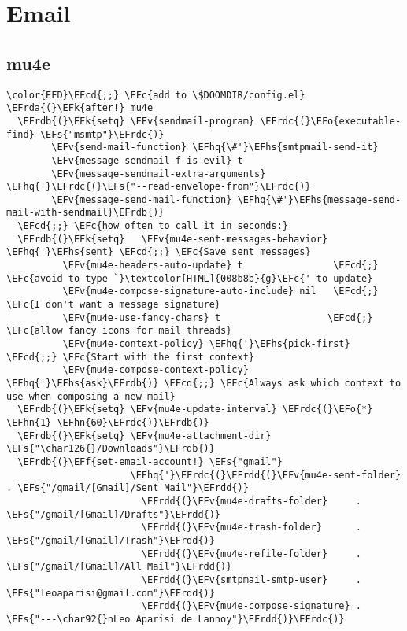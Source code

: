 \documentclass[c]{article}
\theoremstyle{plain}%
\theoremstyle{definition}
\theoremstyle{remark}
\newcommand{\EFc}[1]{\textcolor{EFc}{#1}} %
\newcommand{\EFcd}[1]{\textcolor{EFcd}{#1}} %
\newcommand{\EFs}[1]{\textcolor{EFs}{#1}} %
\newcommand{\EFk}[1]{\textcolor{EFk}{#1}} %
\newcommand{\EFf}[1]{\textcolor{EFf}{#1}} %
\newcommand{\EFv}[1]{\textcolor{EFv}{#1}} %
\newcommand{\EFo}[1]{\textcolor{EFo}{#1}} %
\newcommand{\EFhn}[1]{\textcolor{EFhn}{\textbf{#1}}} %
\newcommand{\EFhq}[1]{\textcolor{EFhq}{#1}} %
\newcommand{\EFhs}[1]{\textcolor{EFhs}{#1}} %
\newcommand{\EFrda}[1]{\textcolor{EFrda}{#1}} %
\newcommand{\EFrdb}[1]{\textcolor{EFrdb}{#1}} %
\newcommand{\EFrdc}[1]{\textcolor{EFrdc}{#1}} %
\newcommand{\EFrdd}[1]{\textcolor{EFrdd}{#1}} %
\begin{document}
\section{Email}
\label{sec:org50947d9}
\subsection{mu4e}
\label{sec:org470a5e9}
\begin{Code}
\begin{Verbatim}
\color{EFD}\EFcd{;;} \EFc{add to \$DOOMDIR/config.el}
\EFrda{(}\EFk{after!} mu4e
  \EFrdb{(}\EFk{setq} \EFv{sendmail-program} \EFrdc{(}\EFo{executable-find} \EFs{"msmtp"}\EFrdc{)}
        \EFv{send-mail-function} \EFhq{\#'}\EFhs{smtpmail-send-it}
        \EFv{message-sendmail-f-is-evil} t
        \EFv{message-sendmail-extra-arguments} \EFhq{'}\EFrdc{(}\EFs{"--read-envelope-from"}\EFrdc{)}
        \EFv{message-send-mail-function} \EFhq{\#'}\EFhs{message-send-mail-with-sendmail}\EFrdb{)}
  \EFcd{;;} \EFc{how often to call it in seconds:}
  \EFrdb{(}\EFk{setq}   \EFv{mu4e-sent-messages-behavior} \EFhq{'}\EFhs{sent} \EFcd{;;} \EFc{Save sent messages}
          \EFv{mu4e-headers-auto-update} t                \EFcd{;} \EFc{avoid to type `}\textcolor[HTML]{008b8b}{g}\EFc{' to update}
          \EFv{mu4e-compose-signature-auto-include} nil   \EFcd{;} \EFc{I don't want a message signature}
          \EFv{mu4e-use-fancy-chars} t                   \EFcd{;} \EFc{allow fancy icons for mail threads}
          \EFv{mu4e-context-policy} \EFhq{'}\EFhs{pick-first}   \EFcd{;;} \EFc{Start with the first context}
          \EFv{mu4e-compose-context-policy} \EFhq{'}\EFhs{ask}\EFrdb{)} \EFcd{;;} \EFc{Always ask which context to use when composing a new mail}
  \EFrdb{(}\EFk{setq} \EFv{mu4e-update-interval} \EFrdc{(}\EFo{*} \EFhn{1} \EFhn{60}\EFrdc{)}\EFrdb{)}
  \EFrdb{(}\EFk{setq} \EFv{mu4e-attachment-dir} \EFs{"\char126{}/Downloads"}\EFrdb{)}
  \EFrdb{(}\EFf{set-email-account!} \EFs{"gmail"}
                      \EFhq{'}\EFrdc{(}\EFrdd{(}\EFv{mu4e-sent-folder}       . \EFs{"/gmail/[Gmail]/Sent Mail"}\EFrdd{)}
                        \EFrdd{(}\EFv{mu4e-drafts-folder}     . \EFs{"/gmail/[Gmail]/Drafts"}\EFrdd{)}
                        \EFrdd{(}\EFv{mu4e-trash-folder}      . \EFs{"/gmail/[Gmail]/Trash"}\EFrdd{)}
                        \EFrdd{(}\EFv{mu4e-refile-folder}     . \EFs{"/gmail/[Gmail]/All Mail"}\EFrdd{)}
                        \EFrdd{(}\EFv{smtpmail-smtp-user}     . \EFs{"leoaparisi@gmail.com"}\EFrdd{)}
                        \EFrdd{(}\EFv{mu4e-compose-signature} . \EFs{"---\char92{}nLeo Aparisi de Lannoy"}\EFrdd{)}\EFrdc{)}

\end{Verbatim}
\end{Code}
\end{document}
